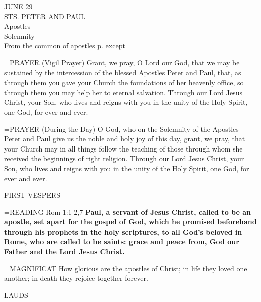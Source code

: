 \begin{center}\normalsize JUNE 29\\
\footnotesize STS. PETER AND PAUL\\
\footnotesize Apostles\\
\footnotesize Solemnity\\
\footnotesize From the common of apostles p.    except	\\
\end{center}

\hangindent=\parindent \small{PRAYER 
(Vigil Prayer)
Grant, we pray, O Lord our God,
that we may be sustained
by the intercession of the blessed Apostles Peter and Paul,
that, as through them you gave your Church
the foundations of her heavenly office,
so through them you may help her to eternal salvation.
Through our Lord Jesus Christ, your Son,
who lives and reigns with you in the unity of the Holy Spirit,
one God, for ever and ever.\\}
 
\hangindent=\parindent \small{PRAYER 
(During the Day)
O God, who on the Solemnity of the Apostles Peter and Paul
give us the noble and holy joy of this day,
grant, we pray, that your Church
may in all things follow the teaching
of those through whom she received
the beginnings of right religion.
Through our Lord Jesus Christ, your Son,
who lives and reigns with you in the unity of the Holy Spirit,
one God, for ever and ever.\\}
 
\begin{flushleft}\normalsize FIRST VESPERS\\\end{flushleft}

\hangindent=\parindent \small{READING} Rom 1:1-2,7 \textbf{Paul, a servant of Jesus Christ, called to be
an apostle, set apart for the gospel of God, which he promised
beforehand through his prophets in the holy scriptures, to all God’s
beloved in Rome, who are called to be saints: grace and peace from,
God our Father and the Lord Jesus Christ.\\}
 
\hangindent=\parindent \small{MAGNIFICAT  How glorious are the apostles of Christ; in life they loved
one another; in death they rejoice together forever.\\}
 
\begin{flushleft}\normalsize LAUDS\\\end{flushleft}

